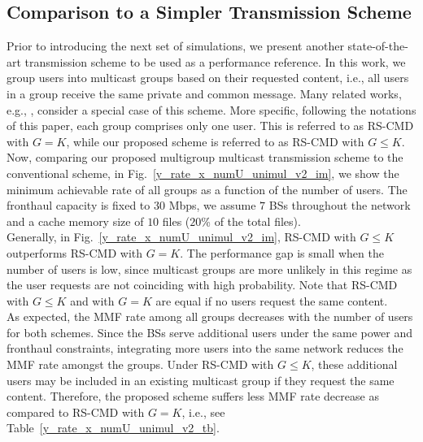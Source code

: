 \documentclass[12pt,draftcls,onecolumn]{IEEEtran}
\theoremstyle{remark}
\theoremstyle{definition}
\begin{document}
{\subsection{Comparison to a Simpler Transmission Scheme}\label{mul_uni}
Prior to introducing the next set of simulations, we present another state-of-the-art transmission scheme to be used as a performance reference. In this work, we group users into multicast groups based on their requested content, i.e., all users in a group receive the same private and common message. Many related works, e.g., \cite{7925639,7499119}, consider a special case of this scheme. More specific, following the notations of this paper, each group comprises only one user. This is referred to as RS-CMD with $G= K$, while our proposed scheme is referred to as RS-CMD with $G\leq K$. \\
\indent Now, comparing our proposed multigroup multicast transmission scheme to the conventional scheme, in Fig.~\ref{y_rate_x_numU_unimul_v2_im}, we show the minimum achievable rate of all groups as a function of the number of users. The fronthaul capacity is fixed to $30$ Mbps, we assume $7$ BSs throughout the network and a cache memory size of $10$ files ($20$\% of the total files). \\
\indent Generally, in Fig.~\ref{y_rate_x_numU_unimul_v2_im}, RS-CMD with $G\leq K$ outperforms RS-CMD with $G= K$. The performance gap is small when the number of users is low, since multicast groups are more unlikely in this regime as the user requests are not coinciding with high probability. Note that RS-CMD with $G\leq K$ and with $G= K$ are equal if no users request the same content. \\
\indent As expected, the MMF rate among all groups decreases with the number of users for both schemes. Since the BSs serve additional users under the same power and fronthaul constraints, integrating more users into the same network reduces the MMF rate amongst the groups. Under RS-CMD with $G\leq K$, these additional users may be included in an existing multicast group if they request the same content. Therefore, the proposed scheme suffers less MMF rate decrease as compared to RS-CMD with $G=K$, i.e., see Table~\ref{y_rate_x_numU_unimul_v2_tb}.
}
\end{document}
